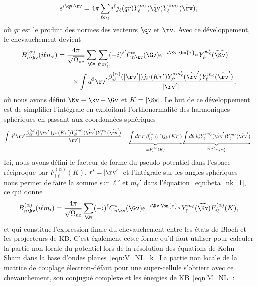 \begin{equation}
    e^{i\qv\cdot\rv} = 4\pi \sum_{\ell m_\ell}i^\ell j_\ell (qr)Y_\ell^{m_\ell}(\hat{\qv})Y_\ell^{*m_\ell}(\hat{\rv}),
\end{equation}
où $qr$ est le produit des normes des vecteurs $\qv$ et $\rv$. Avec ce développement, le chevauchement devient
\begin{align}
    B_{n\kv}^{(\alpha)}(i\ell m_\ell) &=\frac{4\pi}{\sqrt{\Omega_\text{uc}}}\sum_\Gv\sum_{\ell'm_\ell'}(-i)^{\ell'}C^*_{n\kv}(\Gv)e^{-i\Kv\cdot\bm{\tau}_\alpha}Y_{\ell'}^{m_\ell'}(\widehat{\Kv})\notag\\
    &\qquad\times\int d^3\rv'\frac{\beta_{i\ell}^{(\alpha)}(|\rv'|)j_{\ell'}(Kr')Y_{\ell'}^{*m_\ell'}(\hat{\rv}')Y_{\ell}^{m_\ell}(\hat{\rv}')}{|\rv'|},\label{eqn:beta_nk_1}
\end{align}
où nous avons défini $\Kv\equiv\kv+\Gv$ et $K=|\Kv|$. Le but de ce développement est de simplifier l'intégrale en exploitant l'orthonormalité des harmoniques sphériques en passant aux coordonnées sphériques
\begin{equation}
    \int d^3\rv'\frac{\beta_{i\ell}^{(\alpha)}(|\rv'|)j_{\ell'}(Kr')Y_{\ell'}^{*m_\ell'}(\hat{\rv}')Y_{\ell}^{m_\ell}(\hat{\rv}')}{|\rv'|} = \underbrace{\int dr' r' \beta_{i\ell}^{(\alpha)}(r')j_{\ell'}(Kr')}_{\equiv F_{i\ell}^{(\alpha)}(K)}\underbrace{\int d\theta d\phi Y_{\ell'}^{*m_\ell'}(\hat{\rv}')Y_\ell^{m_\ell}(\hat{\rv}')}_{\delta_{\ell\ell'}\delta_{m_\ell m_\ell'}}.
\end{equation}
Ici, nous avons défini le facteur de forme du pseudo-potentiel dans l'espace réciproque par $F_{i\ell}^{(\alpha)}(K)$, $r'=|\rv'|$ et l'intégrale sur les angles sphériques nous permet de faire la somme sur $\ell'$ et $m_\ell'$ dans l'équation~\eqref{eqn:beta_nk_1}, ce qui donne
\begin{equation}
    B_{n\kv}^{(\alpha)}(i\ell m_\ell) =\frac{4\pi}{\sqrt{\Omega_\text{uc}}}\sum_\Gv(-i)^\ell C_{n\kv}^*(\Gv)e^{-i\Kv\cdot\bm{\tau}_\alpha}Y_\ell^{m_\ell}(\widehat{\Kv})F_{i\ell}^{(\alpha)}(K),
\end{equation}
et qui constitue l'expression finale du chevauchement entre les états de Bloch et les projecteurs de KB. C'est également cette forme qu'il faut utiliser pour calculer la partie non locale du potentiel lors de la résolution des équations de Kohn-Sham dans la base d'ondes planes~\eqref{eqn:V_NL_k}. La partie non locale de la matrice de couplage électron-défaut pour une super-cellule s'obtient avec ce chevauchement, son conjugué complexe et les énergies de KB~\eqref{eqn:M_NL} :
